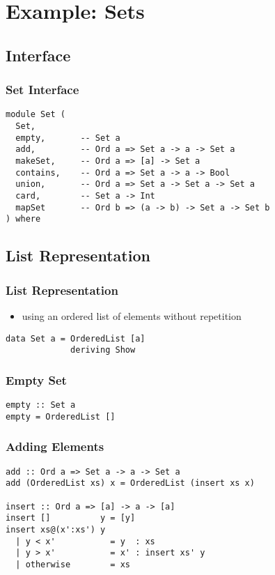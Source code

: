 \documentclass[dvipsnames]{beamer}
\theoremstyle{plain}
\begin{document}
\section{Example: Sets}

\subsection{Interface}

\begin{frame}[fragile]
  \frametitle{Set Interface}

  \begin{lstlisting}[deletekeywords={union}]
module Set (
  Set,
  empty,       -- Set a
  add,         -- Ord a => Set a -> a -> Set a
  makeSet,     -- Ord a => [a] -> Set a
  contains,    -- Ord a => Set a -> a -> Bool
  union,       -- Ord a => Set a -> Set a -> Set a
  card,        -- Set a -> Int
  mapSet       -- Ord b => (a -> b) -> Set a -> Set b
) where
  \end{lstlisting}
\end{frame}

\subsection{List Representation}

\begin{frame}[fragile]
  \frametitle{List Representation}

  \begin{itemize}
    \item using an ordered list of elements without repetition
  \end{itemize}

  \begin{exampleblock}{}
    \begin{lstlisting}
data Set a = OrderedList [a]
             deriving Show
    \end{lstlisting}
  \end{exampleblock}
\end{frame}

\begin{frame}[fragile]
  \frametitle{Empty Set}

  \begin{lstlisting}
empty :: Set a
empty = OrderedList []
  \end{lstlisting}
\end{frame}

\begin{frame}[fragile]
  \frametitle{Adding Elements}

  \begin{lstlisting}[deletekeywords={insert}]
add :: Ord a => Set a -> a -> Set a
add (OrderedList xs) x = OrderedList (insert xs x)

insert :: Ord a => [a] -> a -> [a]
insert []          y = [y]
insert xs@(x':xs') y
  | y < x'           = y  : xs
  | y > x'           = x' : insert xs' y
  | otherwise        = xs
  \end{lstlisting}
\end{frame}
\end{document}

